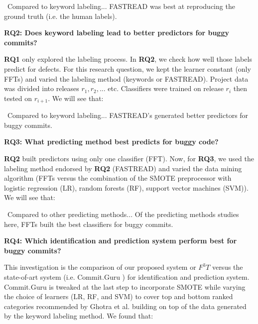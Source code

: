 \documentclass[10pt,journal,compsoc]{IEEEtran}
\newenvironment{RQ}[1]%
{\noindent\begin{minipage}[c]{\linewidth}%
\begin{bclogo}[couleur=gray!25,%
                arrondi=0.1,%
                logo=\bctrombone,%
                ombre=true]{{\normalsize ~#1}}}%
{\end{bclogo}\end{minipage}\vspace{2mm}}
\begin{document}
\begin{RQ}{Compared to keyword labeling...}
FASTREAD was best at reproducing the ground truth (i.e. the human labels).
\end{RQ}


\noindent
{\bf RQ2: Does keyword labeling lead to  better predictors for buggy commits? }

{\bf RQ1} only explored the labeling process.  
In {\bf RQ2}, we 
check how well those labels predict for defects.
For this research question, we kept the learner constant  (only FFTs) and varied
the labeling method (keywords or FASTREAD).
Project data
was divided into releases $r_1, r_2,... $ etc.
Classifiers were trained on release $r_i$ 
then tested on $r_{i+1}$. 
  We will see that:

\begin{RQ}{Compared to keyword labeling...} 
FASTREAD's   generated better   predictors for buggy commits.
\end{RQ}
  
  
\noindent
{\bf RQ3: What predicting method best predicts for buggy code?}

{\bf RQ2} built predictors using only one classifier (FFT). 
Now, for {\bf RQ3},  we used the labeling method endorsed
by {\bf RQ2} (FASTREAD) and varied
the data mining algorithm (FFTs versus the combination of the SMOTE preprocessor with logistic regression (LR), random forests (RF),
support vector machines (SVM)). 
 We will see that:

\begin{RQ}{Compared to other predicting methods...}
Of the predicting methods studies here, FFTs built the best classifiers for buggy commits.
\end{RQ}


{\bf RQ4: Which identification and prediction system perform best for buggy commits?}

This investigation is the comparison of our proposed  system or $F^3T$ versus the state-of-art system (i.e. Commit.Guru \cite{commitguru}) for identification and prediction system. Commit.Guru is tweaked at the last step to incorporate SMOTE while varying the choice of learners (LR, RF, and SVM) to cover top and bottom ranked categories recommended by Ghotra et al. \cite{ghotra15} building on top of the data generated by the keyword labeling method. 
We found that:
\end{document}
